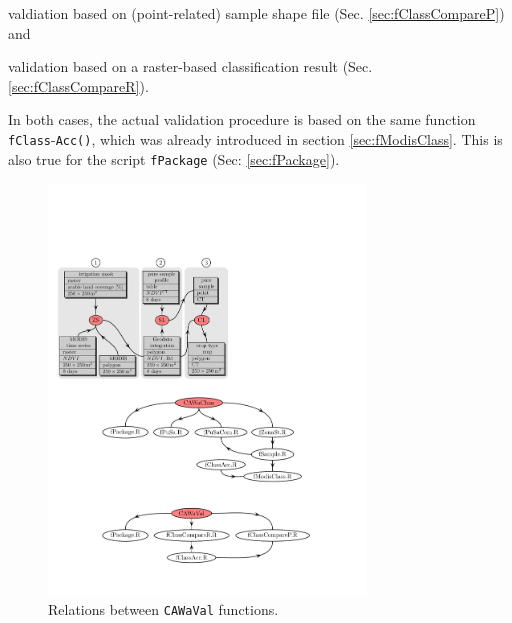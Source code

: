 \begin{compactenum}
\item valdiation based on (point-related) sample shape file (Sec. \ref{sec:fClassCompareP}) and 
\item validation based on a raster-based classification result (Sec. \ref{sec:fClassCompareR}).
\end{compactenum}

In both cases, the actual validation procedure is based on the same function \texttt{fClass}-\texttt{Acc()}, which  was already introduced in section \ref{sec:fModisClass}. This is also true for the  script \texttt{fPackage} (Sec: \ref{sec:fPackage}).

\begin{figure}[p]
\centering\includegraphics[width=0.75\textwidth]{figures/CAWaVal_functions.pdf}
\caption{Relations between \texttt{CAWaVal} functions.}\label{fig:cawaval-functions}
\end{figure}

